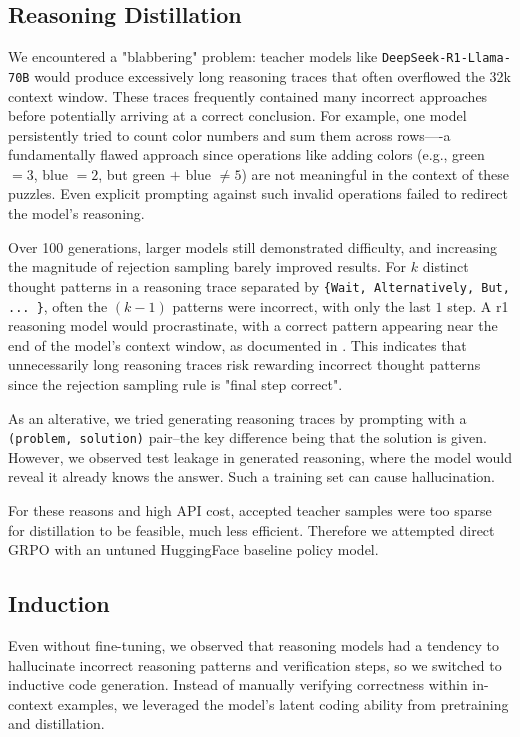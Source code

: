 \documentclass{article}
\begin{document}
\subsection{Reasoning Distillation}

We encountered a "blabbering" problem: teacher models like \texttt{DeepSeek-R1-Llama-70B} would produce excessively long reasoning traces that often overflowed the 32k context window. These traces frequently contained many incorrect approaches before potentially arriving at a correct conclusion. For example, one model persistently tried to count color numbers and sum them across rows—-a fundamentally flawed approach since operations like adding colors (e.g., green $=3$, blue $=2$, but green $+$ blue $\neq 5$) are not meaningful in the context of these puzzles. Even explicit prompting against such invalid operations failed to redirect the model's reasoning.

Over 100 generations, larger models still demonstrated difficulty, and increasing the magnitude of rejection sampling barely improved results. For $k$ distinct thought patterns in a reasoning trace separated by \texttt{\{Wait, Alternatively, But, ... \}}, often the $(k-1)$ patterns were incorrect, with only the last $1$ step. A r1 reasoning model would procrastinate, with a correct pattern appearing near the end of the model's context window, as documented in \cite{qu_optimizing_2025}. This indicates that unnecessarily long reasoning traces risk rewarding incorrect thought patterns since the rejection sampling rule is "final step correct".

As an alterative, we tried generating reasoning traces by prompting with a \texttt{(problem, solution)} pair--the key difference being that the solution is given. However, we observed test leakage in generated reasoning, where the model would reveal it already knows the answer. Such a training set can cause hallucination.

For these reasons and high API cost, accepted teacher samples were too sparse for distillation to be feasible, much less efficient. Therefore we attempted direct GRPO with an untuned HuggingFace baseline policy model.

\subsection{Induction}

Even without fine-tuning, we observed that reasoning models had a tendency to hallucinate incorrect reasoning patterns and verification steps, so we switched to inductive code generation. Instead of manually verifying correctness within in-context examples, we leveraged the model's latent coding ability from pretraining and distillation.
\end{document}
